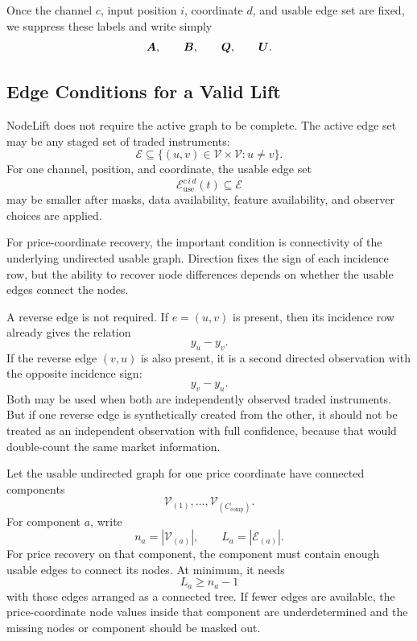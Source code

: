 Once the channel $c$, input position $i$, coordinate $d$, and usable edge set
are fixed, we suppress these labels and write simply
\[
  \bm{A},
  \qquad
  \bm{B},
  \qquad
  \bm{Q},
  \qquad
  \bm{U}.
\]


\subsection{Edge Conditions for a Valid Lift}
\label{subsec:edge-conditions-for-valid-lift}

NodeLift does not require the active graph to be complete.  The active edge set
may be any staged set of traded instruments:
\[
  \mathcal{E}
  \subseteq
  \{(u,v)\in\mathcal{V}\times\mathcal{V}:u\ne v\}.
\]
For one channel, position, and coordinate, the usable edge set
\[
  \mathcal{E}_{\mathrm{use}}^{c\,i\,d}(t)
  \subseteq
  \mathcal{E}
\]
may be smaller after masks, data availability, feature availability, and
observer choices are applied.

For price-coordinate recovery, the important condition is connectivity of the
underlying undirected usable graph.  Direction fixes the sign of each incidence
row, but the ability to recover node differences depends on whether the usable
edges connect the nodes.

A reverse edge is not required.  If $e=(u,v)$ is present, then its incidence row
already gives the relation
\[
  y_u-y_v.
\]
If the reverse edge $(v,u)$ is also present, it is a second directed
observation with the opposite incidence sign:
\[
  y_v-y_u.
\]
Both may be used when both are independently observed traded instruments.  But
if one reverse edge is synthetically created from the other, it should not be
treated as an independent observation with full confidence, because that would
double-count the same market information.

Let the usable undirected graph for one price coordinate have connected
components
\[
  \mathcal{V}_{(1)},\ldots,\mathcal{V}_{(C_{\mathrm{comp}})}.
\]
For component $a$, write
\[
  n_a = |\mathcal{V}_{(a)}|,
  \qquad
  L_a = |\mathcal{E}_{(a)}|.
\]
For price recovery on that component, the component must contain enough usable
edges to connect its nodes.  At minimum, it needs
\[
  L_a \ge n_a-1
\]
with those edges arranged as a connected tree.  If fewer edges are available, the
price-coordinate node values inside that component are underdetermined and the
missing nodes or component should be masked out.

